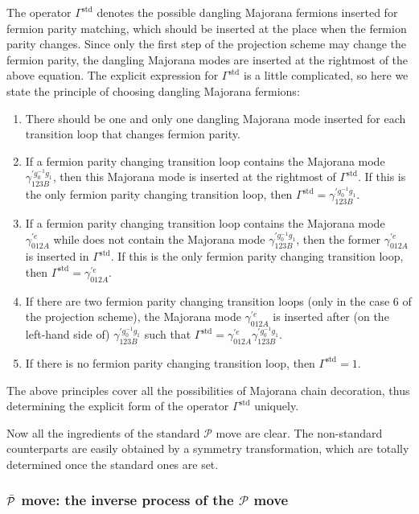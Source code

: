 \documentclass[%
 reprint,
 amsmath,amssymb,
 aps,
prb,
]{revtex4-2}
\begin{document}
The operator $\Gamma^{\mathrm{std}}$ denotes the possible dangling Majorana fermions inserted for fermion parity matching, which should be inserted at the place when the fermion parity changes.
Since only the first step of the projection scheme may change the fermion parity, the dangling Majorana modes are inserted at the rightmost of the above equation.
The explicit expression for $\Gamma^{\mathrm{std}}$ is a little complicated, so here we state the principle of choosing dangling Majorana fermions: 
\begin{enumerate}
\item There should be one and only one dangling Majorana mode inserted for each transition loop that changes fermion parity.
\item If a fermion parity changing transition loop contains the Majorana mode $\gamma^{\prime g^{-1}_0 g_1}_{123B}$, then this Majorana mode is inserted at the rightmost of $\Gamma^{\mathrm{std}}$.
If this is the only fermion parity changing transition loop, then $\Gamma^{\mathrm{std}} = \gamma^{\prime g^{-1}_0 g_1}_{123B}$.
\item If a fermion parity changing transition loop contains the Majorana mode $\gamma^{\prime e}_{012A}$ while does not contain the Majorana mode $\gamma^{\prime g^{-1}_0 g_1}_{123B}$, then the former $\gamma^{\prime e}_{012A}$ is inserted in $\Gamma^{\mathrm{std}}$.
If this is the only fermion parity changing transition loop, then $\Gamma^{\mathrm{std}} = \gamma^{\prime e}_{012A}$.
\item If there are two fermion parity changing transition loops (only in the case 6 of the projection scheme), the Majorana mode $\gamma^{\prime e}_{012A}$ is inserted after (on the left-hand side of) $\gamma^{\prime g^{-1}_0 g_1}_{123B}$ such that $\Gamma^{\mathrm{std}} = \gamma^{\prime e}_{012A} \gamma^{\prime g^{-1}_0 g_1}_{123B}$.
\item If there is no fermion parity changing transition loop, then $\Gamma^{\mathrm{std}} = 1$.
\end{enumerate}
The above principles cover all the possibilities of Majorana chain decoration, thus determining the explicit form of the operator $\Gamma^{\mathrm{std}}$ uniquely.

Now all the ingredients of the standard $\mathcal P$ move are clear.
The non-standard counterparts are easily obtained by a symmetry transformation, which are totally determined once the standard ones are set.

\subsubsection{$\Bar{\mathcal P}$ move: the inverse process of the $\mathcal P$ move}
\end{document}

